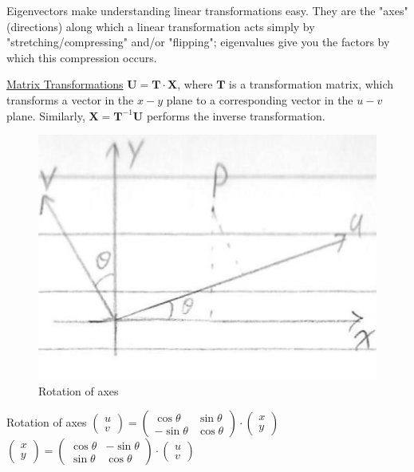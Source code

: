\documentclass[12pt]{article}
\begin{document}
\begin{flushleft}
	Eigenvectors make understanding linear transformations easy. They are the "axes" (directions) along which a linear transformation acts simply by "stretching/compressing" and/or "flipping"; eigenvalues give you the factors by which this compression occurs. \linebreak 
	
	\uline{Matrix Transformations} \linebreak 
	\textbullet \quad $\textbf{U} = \textbf{T} \cdot \textbf{X} $, where $\textbf{T}$ is a transformation matrix, which transforms a vector in the $x-y$ plane to a corresponding vector in the $u-v$ plane. Similarly, $\textbf{X} = \textbf{T}^{-1} \textbf{U}$ performs the inverse transformation. \linebreak 
	
	\begin{figure}[H]
	\centering
	\includegraphics[scale=2]{matrixTransform}
	\caption{Rotation of axes}
	\label{fig:matrixTransform}
	\end{figure}
	
	\textbullet \quad Rotation of axes \linebreak 
	$\displaystyle \begin{pmatrix}
	u \\ v
	\end{pmatrix} = \begin{pmatrix}
	\cos \theta & \sin \theta \\ -\sin \theta & \cos \theta
	\end{pmatrix} \cdot \begin{pmatrix}
	x \\ y
	\end{pmatrix} $ \linebreak 
	$\displaystyle \begin{pmatrix}
	x \\ y
	\end{pmatrix} = \begin{pmatrix}
	\cos \theta & -\sin \theta \\ \sin \theta & \cos \theta
	\end{pmatrix} \cdot \begin{pmatrix}
	u \\ v
	\end{pmatrix} $ \linebreak 
	

\end{flushleft}
\end{document}
